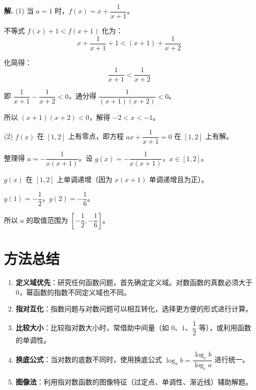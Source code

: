 \documentclass[11pt]{ctexrep}
\begin{document}
\textbf{解.} (1) 当 $a = 1$ 时，$f(x) = x + \dfrac{1}{x+1}$。

不等式 $f(x) + 1 < f(x+1)$ 化为：
\[
    x + \dfrac{1}{x+1} + 1 < (x+1) + \dfrac{1}{x+2}
\]

化简得：
\[
    \dfrac{1}{x+1} < \dfrac{1}{x+2}
\]

即 $\dfrac{1}{x+1} - \dfrac{1}{x+2} < 0$，通分得 $\dfrac{1}{(x+1)(x+2)} < 0$。

所以 $(x+1)(x+2) < 0$，解得 $-2 < x < -1$。

(2) $f(x)$ 在 $[1, 2]$ 上有零点，即方程 $ax + \dfrac{1}{x+1} = 0$ 在 $[1, 2]$ 上有解。

整理得 $a = -\dfrac{1}{x(x+1)}$。设 $g(x) = -\dfrac{1}{x(x+1)}$，$x \in [1, 2]$。

$g(x)$ 在 $[1, 2]$ 上单调递增（因为 $x(x+1)$ 单调递增且为正）。

$g(1) = -\dfrac{1}{2}$，$g(2) = -\dfrac{1}{6}$。

所以 $a$ 的取值范围为 $\left[-\dfrac{1}{2}, -\dfrac{1}{6}\right]$。

\section*{方法总结}

\begin{enumerate}
    \item \textbf{定义域优先}：研究任何函数问题，首先确定定义域。对数函数的真数必须大于 $0$，幂函数的指数不同定义域也不同。
    \item \textbf{指对互化}：指数问题与对数问题可以相互转化，选择更方便的形式进行计算。
    \item \textbf{比较大小}：比较指对数大小时，常借助中间量（如 $0$、$1$、$\dfrac{1}{2}$ 等），或利用函数的单调性。
    \item \textbf{换底公式}：当对数的底数不同时，使用换底公式 $\log_a b = \dfrac{\log_c b}{\log_c a}$ 进行统一。
    \item \textbf{图像法}：利用指对数函数的图像特征（过定点、单调性、渐近线）辅助解题。
\end{enumerate}
\end{document}
